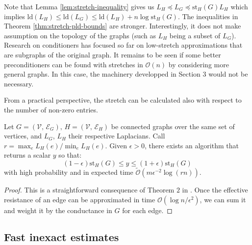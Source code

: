 Note that Lemma \ref{lem:stretch-inequality} gives us $L_{H}\preceq L_{G}\preceq\text{st}_{H}\left(G\right)L_{H}$
which implies $\text{ld}\left(L_{H}\right)\leq\text{ld}\left(L_{G}\right)\leq\text{ld}\left(L_{H}\right)+n\log\text{st}_{H}\left(G\right)$.
The inequalities in Theorem \ref{thm:stretch-pld-bounds} are stronger.
Interestingly, it does not make assumption on the topology of the
graphs (such as $L_{H}$ being a subset of $L_{G}$). Research on
conditioners has focused so far on low-stretch approximations that
are subgraphs of the original graph. It remains to be seen if some
better preconditioners can be found with stretches in $\mathcal{O}\left(n\right)$
by considering more general graphs. In this case, the machinery developped
in Section 3 would not be necessary.

From a practical perspective, the stretch can be calculated also with
respect to the number of non-zero entries.
\begin{lemma}
\label{lem:stretch-approx}Let $G=\left(\mathcal{V},\,\mathcal{E}_{G}\right),\, H=\left(\mathcal{V},\,\mathcal{E}_{H}\right)$
be connected graphs over the same set of vertices, and $L_{G}$, $L_{H}$
their respective Laplacians. Call $r=\max_{e}L_{H}\left(e\right)/\min_{e}L_{H}\left(e\right)$.
Given $\epsilon>0$, there exists an algorithm that returns a scalar
$y$ so that: 
\[
\left(1-\epsilon\right)\text{st}_{H}\left(G\right)\leq y\leq\left(1+\epsilon\right)\text{st}_{H}\left(G\right)
\]
with high probability and in expected time $\tilde{\mathcal{O}}\left(m\epsilon^{-2}\log\left(rn\right)\right)$.\end{lemma}
\begin{proof}
This is a straightforward consequence of Theorem $2$ in \cite{Spielman2009}.
Once the effective resistance of an edge can be approximated in time
$\mathcal{O}\left(\log n/\epsilon^{2}\right)$, we can sum it and
weight it by the conductance in $G$ for each edge.
\end{proof}

\subsection{Fast inexact estimates}

